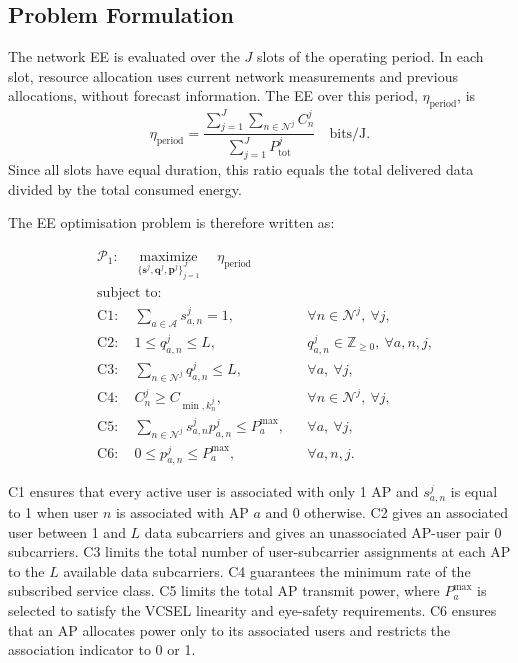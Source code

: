 \documentclass[journal]{IEEEtran}
\begin{document}
\subsection{Problem Formulation}

The network EE is evaluated over the $J$ slots of the operating
period. In each slot, resource allocation uses current network
measurements and previous allocations, without forecast information.
The EE over this period, $\eta_{\mathrm{period}}$, is
\begin{equation}
\eta_{\mathrm{period}}
=
\frac{\displaystyle
\sum_{j=1}^{J}\sum_{n\in\mathcal{N}^{j}}C_{n}^{j}}
{\displaystyle
\sum_{j=1}^{J}P_{\mathrm{tot}}^{j}}
\quad \text{bits/J}.
\label{eq:horizon_energy_efficiency}
\end{equation}
Since all slots have equal duration, this ratio equals the total
delivered data divided by the total consumed energy.

The EE optimisation problem is therefore written as:

\begin{equation}
\begin{aligned}
&\mathcal{P}_{1}:\quad
\underset{
\{\mathbf{s}^{j},\mathbf{q}^{j},\mathbf{p}^{j}\}_{j=1}^{J}
}{\operatorname{maximize}}
\quad \eta_{\mathrm{period}}
\\[1mm]
&\text{subject to:}
\\
&\mathrm{C1}:\quad
\sum_{a\in\mathcal{A}}s_{a,n}^{j}=1,&&\forall n\in\mathcal{N}^{j},\ \forall j,
\\
&\mathrm{C2}:\quad
1\leq q_{a,n}^{j}\leq L,&&q_{a,n}^{j}\in\mathbb{Z}_{\geq0},\ \forall a,n,j,
\\
&\mathrm{C3}:\quad
\sum_{n\in\mathcal{N}^{j}}q_{a,n}^{j}\leq L,&&\forall a,\ \forall j,
\\
&\mathrm{C4}:\quad
C_{n}^{j}\geq C_{\min,k_{n}^{j}},&&\forall n\in\mathcal{N}^{j},\ \forall j,
\\
&\mathrm{C5}:\quad
\sum_{n\in\mathcal{N}^{j}}
s_{a,n}^{j}p_{a,n}^{j}\leq P_{a}^{\max},&&\forall a,\ \forall j,
\\
&\mathrm{C6}:\quad
0\leq p_{a,n}^{j}\leq P_{a}^{\max}, && \forall a,n,j.
\end{aligned}
\label{eq:EE_Opt}
\end{equation}

C1 ensures that every active user is associated with only 1 AP and $s_{a,n}^{j}$ is equal to 1 when user $n$ is associated
with AP $a$ and 0 otherwise. C2 gives an associated user between 1 and $L$ data subcarriers and gives an unassociated AP-user pair 0 subcarriers. C3 limits the total number of user-subcarrier assignments at each AP to the $L$ available data subcarriers. C4 guarantees the minimum rate of the subscribed service class. C5 limits the total AP transmit power, where $P_{a}^{\max}$ is selected to satisfy the VCSEL linearity and eye-safety requirements. C6 ensures that an AP allocates power only to its associated users and restricts the association indicator to 0 or 1.
\end{document}
